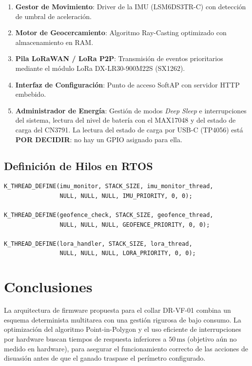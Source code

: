 \begin{enumerate}[leftmargin=*]
    \item \textbf{Gestor de Movimiento}: Driver de la IMU (LSM6DS3TR-C) con detección de umbral de aceleración.
    \item \textbf{Motor de Geocercamiento}: Algoritmo Ray-Casting optimizado con almacenamiento en RAM.
    \item \textbf{Pila LoRaWAN / LoRa P2P}: Transmisión de eventos prioritarios mediante el módulo LoRa DX-LR30-900M22S (SX1262).
    \item \textbf{Interfaz de Configuración}: Punto de acceso SoftAP con servidor HTTP embebido.
    \item \textbf{Administrador de Energía}: Gestión de modos \textit{Deep Sleep} e interrupciones del sistema, lectura del nivel de batería con el MAX17048 y del estado de carga del CN3791. La lectura del estado de carga por USB-C (TP4056) está \textbf{POR DECIDIR}: no hay un GPIO asignado para ella.
\end{enumerate}

\subsection{Definición de Hilos en RTOS}

\begin{verbatim}
K_THREAD_DEFINE(imu_monitor, STACK_SIZE, imu_monitor_thread, 
                NULL, NULL, NULL, IMU_PRIORITY, 0, 0);

K_THREAD_DEFINE(geofence_check, STACK_SIZE, geofence_thread,
                NULL, NULL, NULL, GEOFENCE_PRIORITY, 0, 0);

K_THREAD_DEFINE(lora_handler, STACK_SIZE, lora_thread,
                NULL, NULL, NULL, LORA_PRIORITY, 0, 0);
\end{verbatim}

\section{Conclusiones}

La arquitectura de firmware propuesta para el collar DR-VF-01 combina un esquema determinista multitarea con una gestión rigurosa de bajo consumo. La optimización del algoritmo Point-in-Polygon y el uso eficiente de interrupciones por hardware buscan tiempos de respuesta inferiores a $50\,\text{ms}$ (objetivo aún no medido en hardware), para asegurar el funcionamiento correcto de las acciones de disuasión antes de que el ganado traspase el perímetro configurado.